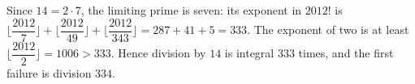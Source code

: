 Since $14=2\cdot7$, the limiting prime is seven: its exponent in $2012!$ is $\lfloor\dfrac{2012}{7}\rfloor+\lfloor\dfrac{2012}{49}\rfloor+\lfloor\dfrac{2012}{343}\rfloor=287+41+5=333$. The exponent of two is at least $\lfloor\dfrac{2012}{2}\rfloor=1006>333$. Hence division by $14$ is integral $333$ times, and the first failure is division $\boxed{334}$.
